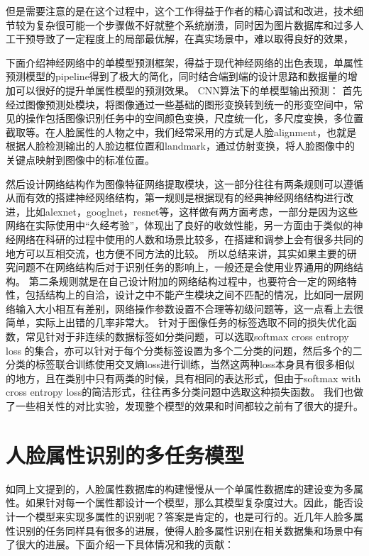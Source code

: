 但是需要注意的是在这个过程中，这个工作得益于作者的精心调试和改进，技术细节较为复杂很可能一个步骤做不好就整个系统崩溃，同时因为图片数据库和过多人工干预导致了一定程度上的局部最优解，在真实场景中，难以取得良好的效果，

下面介绍神经网络中的单模型预测框架，得益于现代神经网络的出色表现，单属性预测模型的pipeline得到了极大的简化，同时结合端到端的设计思路和数据量的增加可以很好的提升单属性模型的预测效果。
CNN算法下的单模型输出预测：
首先经过图像预测处模块，将图像通过一些基础的图形变换转到统一的形变空间中，常见的操作包括图像识别任务中的空间颜色变换，尺度统一化，多尺度变换，多位置截取等。在人脸属性的人物之中，我们经常采用的方式是人脸alignment，也就是根据人脸检测输出的人脸边框位置和landmark，通过仿射变换，将人脸图像中的关键点映射到图像中的标准位置。

然后设计网络结构作为图像特征网络提取模块，这一部分往往有两条规则可以遵循从而有效的搭建神经网络结构，第一规则是根据现有的经典神经网络结构进行改进，比如alexnet，googlnet，resnet等，这样做有两方面考虑，一部分是因为这些网络在实际使用中“久经考验”，体现出了良好的收敛性能，另一方面由于类似的神经网络在科研的过程中使用的人数和场景比较多，在搭建和调参上会有很多共同的地方可以互相交流，也方便不同方法的比较。
所以总结来讲，其实如果主要的研究问题不在网络结构后对于识别任务的影响上，一般还是会使用业界通用的网络结构。
第二条规则就是在自己设计附加的网络结构过程中，也要符合一定的网络特性，包括结构上的自洽，设计之中不能产生模块之间不匹配的情况，比如同一层网络输入大小相互有差别，网络操作参数设置不合理等初级问题等，这一点看上去很简单，实际上出错的几率非常大。
针对于图像任务的标签选取不同的损失优化函数，常见针对于非连续的数据标签如分类问题，可以选取softmax cross entropy loss	的集合，亦可以针对于每个分类标签设置为多个二分类的问题，然后多个的二分类的标签联合训练使用交叉熵loss进行训练，当然这两种loss本身具有很多相似的地方，且在类别中只有两类的时候，具有相同的表达形式，但由于softmax with cross entropy loss的简洁形式，往往再多分类问题中选取这种损失函数。
我们也做了一些相关性的对比实验，发现整个模型的效果和时间都较之前有了很大的提升。

\section{人脸属性识别的多任务模型}
如同上文提到的，人脸属性数据库的构建慢慢从一个单属性数据库的建设变为多属性。如果针对每一个属性都设计一个模型，那么其模型复杂度过大。因此，能否设计一个模型来实现多属性的识别呢？答案是肯定的，也是可行的。近几年人脸多属性识别的任务同样具有很多的进展，使得人脸多属性识别在相关数据集和场景中有了很大的进展。下面介绍一下具体情况和我的贡献：

